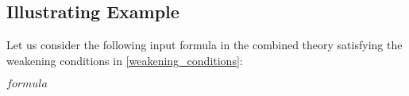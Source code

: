\subsection{Illustrating 
Example}

Let us consider the following input formula in the
combined theory satisfying the weakening conditions in 
\ref{weakening_conditions}:

$formula$

